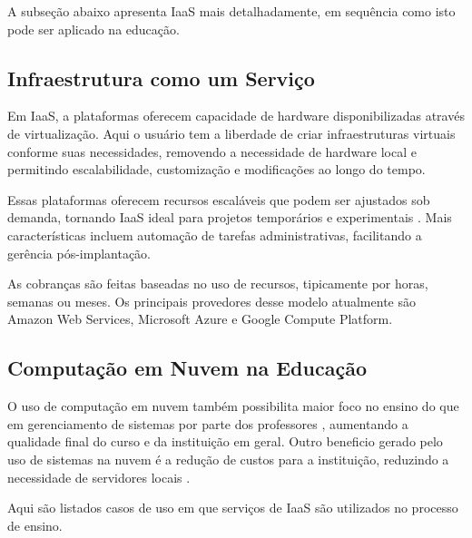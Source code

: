 \documentclass[tg]{mdtufsm}
\begin{document}
A subseção abaixo apresenta IaaS mais detalhadamente, em sequência como isto pode ser aplicado na educação.

\subsection{Infraestrutura como um Serviço}

Em IaaS, a plataformas oferecem capacidade de hardware disponibilizadas através de virtualização. Aqui o usuário tem a liberdade de criar infraestruturas virtuais conforme suas necessidades, removendo a necessidade de hardware local e permitindo escalabilidade, customização e modificações ao longo do tempo.

Essas plataformas oferecem recursos escaláveis que podem ser ajustados sob demanda, tornando IaaS ideal para projetos temporários e experimentais \cite{iaas}. Mais características incluem automação de tarefas administrativas, facilitando a gerência pós-implantação.

As cobranças são feitas baseadas no uso de recursos, tipicamente por horas, semanas ou meses. Os principais provedores desse modelo atualmente são Amazon Web Services, Microsoft Azure e Google Compute Platform.


\subsection{Computação em Nuvem na Educação}

O uso de computação em nuvem também possibilita maior foco no ensino do que em gerenciamento de sistemas por parte dos professores \cite{cloudedu}, aumentando a qualidade final do curso e da instituição em geral. Outro beneficio gerado pelo uso de sistemas na nuvem é a redução de custos para a instituição, reduzindo a necessidade de servidores locais \cite{toutcloud}.

Aqui são listados casos de uso em que serviços de IaaS são utilizados no processo de ensino.
\end{document}
